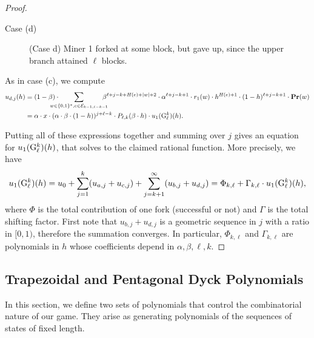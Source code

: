 \begin{proof}
\begin{subsubsection}{Case (d)}
\begin{figure}[ht!]
\caption{(Case d) Miner 1 forked at some block, but gave up, since the upper branch attained $\ell$ blocks.}
\end{figure}


As in case (c), we compute
\begin{align*}
u_{d,j}(h) &= (1-\beta) \cdot \!\!\!\!\!\!\!\!\!\sum_{w\in \bstring, e\in \Pent_{k-1, \ell-k-1}}\!\!\!\!\!\!\beta^{\ell+j-k+H(e)+|w|+2}\cdot \alpha^{\ell+j-k+1}\cdot r_1(w) \cdot h^{H(e)+1}\cdot(1-h)^{\ell+j-k+1}\cdot \pr(w)\\
        &= \alpha\cdot x\cdot(\alpha\cdot\beta\cdot(1-h))^{j+\ell-k}\cdot P_{\ell,k}(\beta\cdot h) \cdot u_1(\gup^k_\ell)(h).
\end{align*}



\end{subsubsection}

Putting all of these expressions together and summing over $j$ gives an equation for $u_1({\rm {G}}^k_\ell)(h)$, that solves to the claimed rational function. More precisely, we have
$$u_1({\rm {G}}^k_\ell)(h) = u_0 + \sum_{j=1}^k (u_{a,j} + u_{c,j}) + \sum_{j=k+1}^\infty (u_{b,j} + u_{d,j}) = \Phi_{k,\ell} + \Gamma_{k,\ell}\cdot u_1({\rm {G}}^k_\ell)(h),$$
where $\Phi$ is the total contribution of one fork (successful or not) and $\Gamma$ is the total shifting factor. First note that $u_{b,j}+u_{d,j}$ is a geometric sequence in $j$ with a ratio in $[0,1)$, therefore the summation converges. In particular, $\Phi_{k,\ell}$ and $\Gamma_{k,\ell}$ are polynomials in $h$ whose coefficients depend in $\alpha,\beta,\ell,k$.
\end{proof}

\subsection{Trapezoidal and Pentagonal Dyck Polynomials}
\label{sec-trapezoid-pentagon}

In this section, we define two sets of polynomials that control the combinatorial nature of our game. They arise as generating polynomials of the sequences of states of fixed length. 

